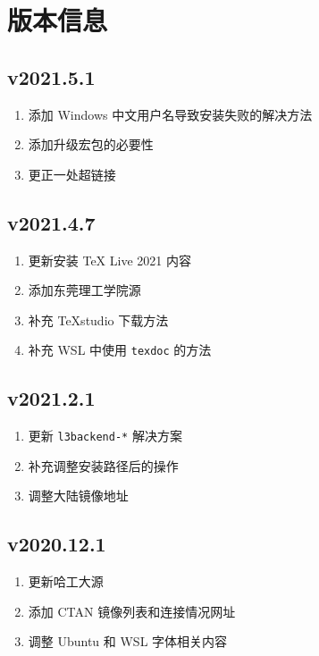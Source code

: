 
\chapter{版本信息}

\section*{v2021.5.1}

\begin{enumerate}
  \item 添加 Windows 中文用户名导致安装失败的解决方法
  \item 添加升级宏包的必要性
  \item 更正一处超链接
\end{enumerate}

\section*{v2021.4.7}

\begin{enumerate}
  \item 更新安装 \TeX{} Live 2021 内容
  \item 添加东莞理工学院源
  \item 补充 \TeX studio 下载方法
  \item 补充 WSL 中使用 \texttt{texdoc} 的方法
\end{enumerate}

\section*{v2021.2.1}

\begin{enumerate}
  \item 更新 \texttt{l3backend-*} 解决方案
  \item 补充调整安装路径后的操作
  \item 调整大陆镜像地址
\end{enumerate}
\section*{v2020.12.1}

\begin{enumerate}
  \item 更新哈工大源
  \item 添加 CTAN 镜像列表和连接情况网址
  \item 调整 Ubuntu 和 WSL 字体相关内容
\end{enumerate}

